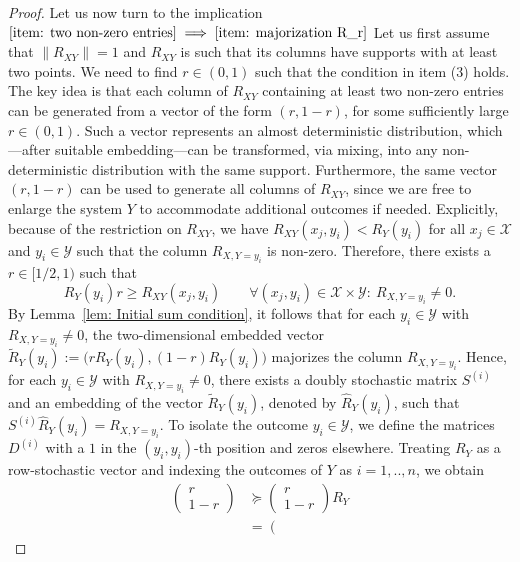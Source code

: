 \documentclass[aps,pra,11pt,onecolumn,nofootinbib,tightenlines]{revtex4-2}
\theoremstyle{definition}
\begin{document}
\begin{proof}
\bigskip
Let us now turn to the implication $\ref{item: two non-zero entries} \implies \ref{item: majorization R_r}$
Let us first assume that $\|R_{XY}\|=1$ and $R_{XY}$ is such that its columns have supports with at least two points. We need to find $r\in(0,1)$ such that the condition in item (3) holds. 
The key idea is that each column of \( R_{XY} \) containing at least two non-zero entries can be generated from a vector of the form \( (r, 1 - r) \), for some sufficiently large \( r \in (0,1) \). Such a vector represents an almost deterministic distribution, which—after suitable embedding—can be transformed, via mixing, into any non-deterministic distribution with the same support. Furthermore, the same vector \( (r, 1 - r) \) can be used to generate all columns of \( R_{XY} \), since we are free to enlarge the system \( Y \) to accommodate additional outcomes if needed. Explicitly, 
because of the restriction on $R_{XY}$, we have $R_{XY}(x_j,y_i)<R_Y(y_i)$ for all $x_j\in \mathcal{X}$ and $y_i\in \mathcal{Y}$ such that the column $R_{X,Y=y_i}$ is non-zero. Therefore, there exists a $r\in[1/2,1)$ such that
\begin{equation}
R_Y(y_i)r\geq R_{XY}(x_j,y_i)\qquad\forall(x_j,y_i)\in \mathcal{X}\times \mathcal{Y}:\ R_{X,Y=y_i}\neq0.
\end{equation}
By Lemma~\ref{lem: Initial sum condition}, it follows that for each \( y_i \in \mathcal{Y} \) with \( R_{X,Y=y_i} \neq 0 \), the two-dimensional embedded vector $\widetilde{R}_Y(y_i) := \big(r R_Y(y_i), (1 - r) R_Y(y_i)\big)$
majorizes the column \( R_{X,Y=y_i} \).
Hence, for each \( y_i \in \mathcal{Y} \) with \( R_{X,Y=y_i} \neq 0 \), there exists a doubly stochastic matrix \( S^{(i)} \) and an embedding of the vector \( \widetilde{R}_Y(y_i) \), denoted by \( \widehat{R}_Y(y_i) \), such that $S^{(i)} \widehat{R}_Y(y_i) = R_{X,Y=y_i}$.
To isolate the outcome \( y_i \in \mathcal{Y} \), we define the matrices \( D^{(i)} \) with a $1$ in the \( (y_i, y_i) \)-th position and zeros elsewhere. Treating \( R_Y \) as a row-stochastic vector and indexing the outcomes of $Y$ as \( i = 1,..,n \), we obtain
\begin{align}
\left(\begin{array}{c}
r\\1-r
\end{array}\right)&\succeq\left(\begin{array}{c}
r\\1-r
\end{array}\right)R_Y\\
&=\left(\begin{array}{ccc}

\end{array}
\end{align}
\end{proof}
\end{document}
